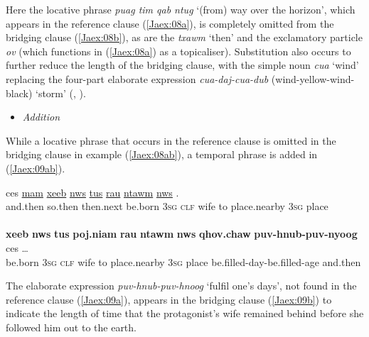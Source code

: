\documentclass[output=paper]{LSP/langsci}
\begin{document}
\noindent
Here the locative phrase \textit{puag tim qab ntug } `(from) way over the horizon', which appears in the reference clause (\ref{Jaex:08a}), is completely omitted from the bridging clause (\ref{Jaex:08b}), as are the   \textit{txawm } `then' and the exclamatory particle \textit{ov} (which functions in (\ref{Jaex:08a}) as a topicaliser). Substitution also occurs to further reduce the length of the bridging clause, with the simple noun \textit{cua} `wind' replacing the four-part elaborate expression \textit{cua-daj-cua-dub }(wind-yellow-wind-black) `storm' (\citealt[][233--237]{jarkey15}, \citealt{johns82,mortensen03}).


\begin{itemize}
\item \textit{Addition}
\end{itemize}

While a locative phrase that occurs in the reference clause is omitted in the bridging clause in example (\ref{Jaex:08ab}), a temporal phrase is added in (\ref{Jaex:09ab}).


\begin{exe}
\ex \label{Jaex:09ab}
\begin{xlist}
\ex \label{Jaex:09a}
\gll ces  \underline{} \underline{mam} \underline{xeeb} \underline{nws} \underline{tus} \underline{} \underline{rau} \underline{ntawm} \underline{nws} \underline{}.\\
and.then so.then  then.next be.born 3\textsc{sg} \textsc{clf} wife to place.nearby 3\textsc{sg} place \\
\glt {}\\
\ex \label{Jaex:09b}
\gll \textbf{xeeb} \textbf{nws} \textbf{tus} \textbf{poj.niam} \textbf{rau} \textbf{ntawm} \textbf{nws} \textbf{qhov.chaw} \textbf{puv-hnub-puv-nyoog}  ces …\\     	      
     be.born 3\textsc{sg} \textsc{clf} wife to place.nearby 3\textsc{sg} place be.filled-day-be.filled-age and.then\\
\glt {} \citep[][3]{johnson92}
\end{xlist}
\end{exe}

\noindent
The elaborate expression \textit{puv-hnub-puv-hnoog} `fulfil one’s days', not found in the reference clause (\ref{Jaex:09a}), appears in the bridging clause (\ref{Jaex:09b}) to indicate the length of time that the protagonist’s wife remained behind before she followed him out to the earth.
 
\end{document}
